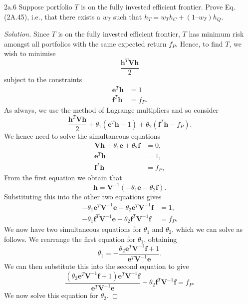 \begin{problem}{2a.6}
Suppose portfolio $T$ is on the fully invested efficient frontier. Prove Eq. (2A.45), i.e., that there
exists a $w_{T}$ such that $h_T = w_T h_C + (1 – w_T )h_Q$.
\end{problem}

\begin{proof}[Solution]
Since $T$ is on the fully invested efficient frontier, $T$ has minimum risk amongst all portfolios with the same expected return $f_{P}$. Hence, to find $T$, we wish to minimise \[\frac{\mathbf{h}^{T}\mathbf{V}\mathbf{h}}{2}\] subject to the constraints
\begin{align*}
\mathbf{e}^{T}\mathbf{h} &= 1\\
\mathbf{f}^{T}\mathbf{h} &= f_{P}.
\end{align*}
As always, we use the method of Lagrange multipliers and so consider \[\frac{\mathbf{h}^{T}\mathbf{V}\mathbf{h}}{2} + \theta_{1}(\mathbf{e}^{T}\mathbf{h} - 1) + \theta_{2}(\mathbf{f}^{T}\mathbf{h} - f_{P}).\] We hence need to solve the simultaneous equations
\begin{align*}
\mathbf{V}\mathbf{h} + \theta_{1}\mathbf{e} + \theta_{2}\mathbf{f} &= 0, \\
\mathbf{e}^{T}\mathbf{h} &= 1, \\
\mathbf{f}^{T}\mathbf{h} &= f_{P},
\end{align*}
From the first equation we obtain that 
\begin{equation}\label{eq:6h}
\mathbf{h} = \mathbf{V}^{-1}(-\theta_{1}\mathbf{e} - \theta_{2}\mathbf{f}).
\end{equation}
Substituting this into the other two equations gives
\begin{align*}
-\theta_{1}\mathbf{e}^{T}\mathbf{V}^{-1}\mathbf{e} - \theta_{2}\mathbf{e}^{T}\mathbf{V}^{-1}\mathbf{f} &= 1,\\
-\theta_{1}\mathbf{f}^{T}\mathbf{V}^{-1}\mathbf{e} - \theta_{2}\mathbf{f}^{T}\mathbf{V}^{-1}\mathbf{f} &= f_{P}.
\end{align*}
We now have two simultaneous equations for $\theta_{1}$ and $\theta_{2}$, which we can solve as follows. We rearrange the first equation for $\theta_{1}$, obtaining
\[\theta_{1} = - \frac{\theta_{2}\mathbf{e}^{T}\mathbf{V}^{-1}\mathbf{f} + 1}{\mathbf{e}^{T}\mathbf{V}^{-1}\mathbf{e}}.\] We can then substitute this into the second equation to give \[\frac{(\theta_{2}\mathbf{e}^{T}\mathbf{V}^{-1}\mathbf{f} + 1)\mathbf{e}^{T}\mathbf{V}^{-1}\mathbf{f}}{\mathbf{e}^{T}\mathbf{V}^{-1}\mathbf{e}} - \theta_{2}\mathbf{f}^{T}\mathbf{V}^{-1}\mathbf{f} = f_{P}.\] We now solve this equation for $\theta_{2}$.

\end{proof}
